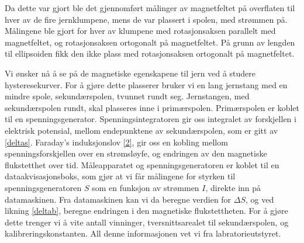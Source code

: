 \documentclass[%
 reprint,
 amsmath,amssymb,
 aps,
]{revtex4-1}
\begin{document}
Da dette var gjort ble det gjennomført målinger av magnetfeltet på overflaten til hver av de fire jernklumpene, mens de var plassert i spolen, med strømmen på. Målingene ble gjort for hver av klumpene med rotasjonsaksen parallelt med magnetfeltet, og rotasjonsaksen ortogonalt på magnetfeltet. På grunn av lengden til ellipsoiden fikk den ikke plass med rotasjonsaksen ortogonalt på magnetfeltet.\par
Vi ønsker nå å se på de magnetiske egenskapene til jern ved å studere hysteresekurver. For å gjøre dette plasserer bruker vi en lang jernstang med en mindre spole, sekundærspolen, tvunnet rundt seg. Jernstangen, med sekundærspolen rundt, skal plasseres inne i primærspolen. Primærspolen er koblet til en spenningsgenerator. Spenningsintegratoren gir oss integralet av forskjellen i elektrisk potensial, mellom endepunktene av sekundærspolen, som er gitt av \eqref{deltas}. Faraday's induksjonslov \eqref{2}, gir oss en kobling mellom spenningsforskjellen over en strømsløyfe, og endringen av den magnetiske flukstetthet over tid. Måleapparatet og spenningsgeneratoren er koblet til en dataakvisasjonsboks, som gjør at vi får målingene for styrken til spenningsgeneratoren $S$ som en funksjon av strømmen $I$, direkte inn på datamaskinen. Fra datamaskinen kan vi da beregne verdien for $\Delta S$, og ved likning \eqref{deltab}, beregne endringen i den magnetiske flukstettheten. For å gjøre dette trenger vi å vite antall vinninger, tversnittsarealet til sekundærspolen, og kalibreringskonstanten. All denne informasjonen vet vi fra labratorieutstyret.
\end{document}
